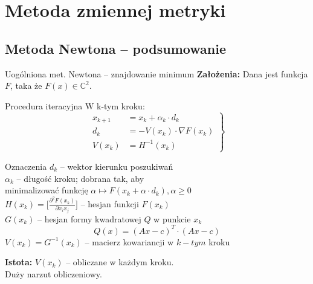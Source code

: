 \section{Metoda zmiennej metryki}

\subsection{Metoda Newtona -- podsumowanie}
  \begin{frame}
    \begin{block}{Uogólniona met. Newtona -- znajdowanie minimum}
      \textbf{Założenia: } Dana jest funkcja $F$, taka że $F(x) \in \mathbb{C}^2$.
    \end{block}
    \begin{block}{Procedura iteracyjna}
      W k-tym kroku:
      \begin{equation}
        \left.
          \begin{aligned}
            x_{k + 1} &= x_{k} + \alpha_{k} \cdot d_{k}\\
            d_{k}     &= - V(x_k) \cdot \nabla F(x_{k})\\
            V(x_k)    &= H^{-1}(x_{k})
          \end{aligned}
       \right\}
      \end{equation}
    \end{block}
  \end{frame}

  \begin{frame}{}
    \begin{block}{Oznaczenia}
      $d_{k}$ -- wektor kierunku poszukiwań\\
      $\alpha_{k}$ -- długość kroku; dobrana tak, aby\\
      \hspace*{8mm} minimalizować funkcję $\alpha \mapsto F(x_{k} + \alpha \cdot d_{k}), \alpha \geq 0$\\
      $H(x_k) = \bigg[ \frac{\partial^2 F(x_{k})}{\partial x_{i} x_{j}} \bigg]$ -- hesjan funkcji $F(x_{k})$\\
      $G(x_k)$ -- hesjan formy kwadratowej $Q$ w punkcie $x_k$\\
      \begin{equation*}
        Q(x) = (Ax - c)^T \cdot (Ax - c)
      \end{equation*}
      $V(x_k) = G^{-1}(x_k)$ -- macierz kowariancji w $k-tym$ kroku
    \end{block}

    \begin{block}{}
      \textbf{Istota: } $V(x_{k})$ -- obliczane w każdym kroku.\\
      Duży narzut obliczeniowy.
    \end{block}
  \end{frame}

